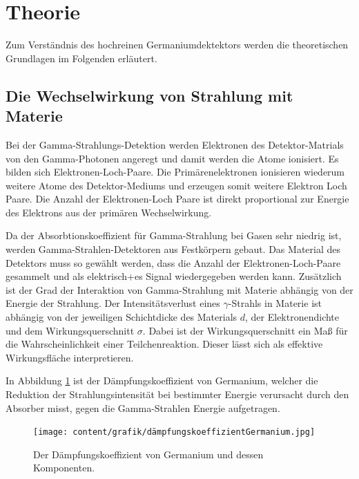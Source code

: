 \section[Theorie]{Theorie \textnormal{\cite{germanium}}}
\label{sec:theorie}

Zum Verständnis des hochreinen Germaniumdektektors werden die theoretischen Grundlagen im Folgenden erläutert.

\subsection{Die Wechselwirkung von Strahlung mit Materie}
\label{sec:WW mit Materie}

Bei der Gamma-Strahlungs-Detektion werden Elektronen des Detektor-Matrials von den Gamma-Photonen angeregt und damit werden die 
Atome ionisiert. Es bilden sich Elektronen-Loch-Paare. Die Primärenelektronen ionisieren wiederum weitere Atome des Detektor-Mediums und erzeugen somit weitere Elektron Loch Paare.
Die Anzahl der Elektronen-Loch Paare ist direkt proportional zur Energie des Elektrons aus der primären
Wechselwirkung.

Da der Absorbtionskoeffizient für Gamma-Strahlung bei Gasen sehr niedrig ist, 
werden Gamma-Strahlen-Detektoren aus Festkörpern gebaut. Das Material des Detektors muss so gewählt werden, dass
die Anzahl der Elektronen-Loch-Paare gesammelt und als elektrisch+es Signal wiedergegeben werden kann.
Zusätzlich ist der Grad der Interaktion von Gamma-Strahlung mit Materie abhängig von der Energie der Strahlung.
Der Intensitätsverlust  eines $\gamma$-Strahls in Materie ist abhängig von der jeweiligen Schichtdicke des Materials $d$,
der Elektronendichte und dem Wirkungsquerschnitt $\sigma$. Dabei ist der Wirkungsquerschnitt ein Maß für die Wahrscheinlichkeit einer Teilchenreaktion.
Dieser lässt sich als effektive Wirkungsfläche interpretieren.

In Abbildung \ref{fig:koeffizient} ist der Dämpfungskoeffizient von Germanium, welcher die Reduktion der Strahlungsintensität
bei bestimmter Energie verursacht durch den Absorber misst, gegen die Gamma-Strahlen Energie aufgetragen.


\begin{figure}[H]
    \centering
    \texttt{[image: content/grafik/dämpfungskoeffizientGermanium.jpg]}
    \caption{Der Dämpfungskoeffizient von Germanium und dessen Komponenten. \cite{gamma_ray}}
    \label{fig:koeffizient}
\end{figure}

